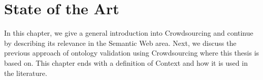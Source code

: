 \chapter{State of the Art}\label{chap:state_of_the_art}
In this chapter, we give a general introduction into Crowdsourcing and continue by describing its relevance in the Semantic Web area. Next, we discuss the previous approach of ontology validation using Crowdsourcing where this thesis is based on. This chapter ends with a definition of Context and how it is used in the literature.











